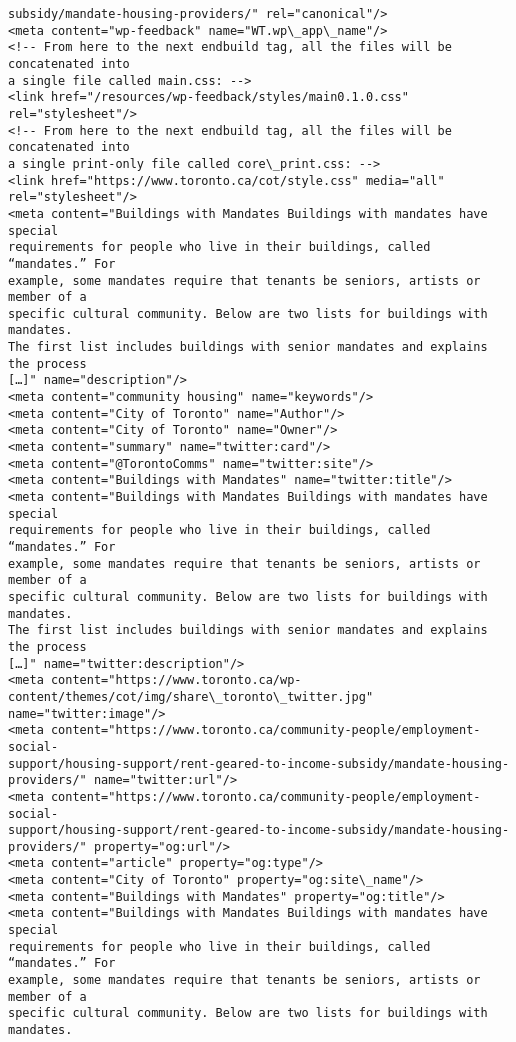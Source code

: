 \documentclass[11pt]{article}
\begin{document}
\begin{Verbatim}[commandchars=\\\{\}]
subsidy/mandate-housing-providers/" rel="canonical"/>
<meta content="wp-feedback" name="WT.wp\_app\_name"/>
<!-- From here to the next endbuild tag, all the files will be concatenated into
a single file called main.css: -->
<link href="/resources/wp-feedback/styles/main0.1.0.css" rel="stylesheet"/>
<!-- From here to the next endbuild tag, all the files will be concatenated into
a single print-only file called core\_print.css: -->
<link href="https://www.toronto.ca/cot/style.css" media="all" rel="stylesheet"/>
<meta content="Buildings with Mandates Buildings with mandates have special
requirements for people who live in their buildings, called “mandates.” For
example, some mandates require that tenants be seniors, artists or member of a
specific cultural community. Below are two lists for buildings with mandates.
The first list includes buildings with senior mandates and explains the process
[…]" name="description"/>
<meta content="community housing" name="keywords"/>
<meta content="City of Toronto" name="Author"/>
<meta content="City of Toronto" name="Owner"/>
<meta content="summary" name="twitter:card"/>
<meta content="@TorontoComms" name="twitter:site"/>
<meta content="Buildings with Mandates" name="twitter:title"/>
<meta content="Buildings with Mandates Buildings with mandates have special
requirements for people who live in their buildings, called “mandates.” For
example, some mandates require that tenants be seniors, artists or member of a
specific cultural community. Below are two lists for buildings with mandates.
The first list includes buildings with senior mandates and explains the process
[…]" name="twitter:description"/>
<meta content="https://www.toronto.ca/wp-
content/themes/cot/img/share\_toronto\_twitter.jpg" name="twitter:image"/>
<meta content="https://www.toronto.ca/community-people/employment-social-
support/housing-support/rent-geared-to-income-subsidy/mandate-housing-
providers/" name="twitter:url"/>
<meta content="https://www.toronto.ca/community-people/employment-social-
support/housing-support/rent-geared-to-income-subsidy/mandate-housing-
providers/" property="og:url"/>
<meta content="article" property="og:type"/>
<meta content="City of Toronto" property="og:site\_name"/>
<meta content="Buildings with Mandates" property="og:title"/>
<meta content="Buildings with Mandates Buildings with mandates have special
requirements for people who live in their buildings, called “mandates.” For
example, some mandates require that tenants be seniors, artists or member of a
specific cultural community. Below are two lists for buildings with mandates.

\end{Verbatim}
\end{document}
